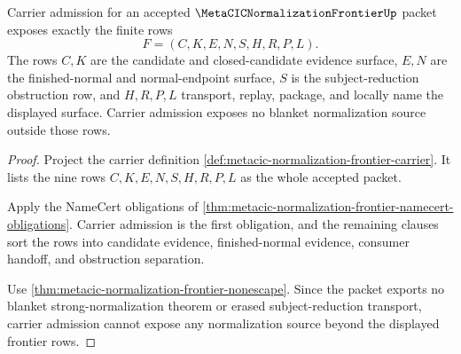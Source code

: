 \begin{theorem}
\label{thm:metacic-normalization-frontier-carrier-admission-route}
Carrier admission for an accepted $\MetaCICNormalizationFrontierUp$ packet exposes exactly the finite rows
$$
F=(C,K,E,N,S,H,R,P,L).
$$
The rows $C,K$ are the candidate and closed-candidate evidence surface, $E,N$ are the finished-normal and normal-endpoint surface, $S$ is the subject-reduction obstruction row, and $H,R,P,L$ transport, replay, package, and locally name the displayed surface. Carrier admission exposes no blanket normalization source outside those rows.
\end{theorem}
\begin{proof}
Project the carrier definition \autoref{def:metacic-normalization-frontier-carrier}. It lists the nine rows $C,K,E,N,S,H,R,P,L$ as the whole accepted packet.

Apply the NameCert obligations of \autoref{thm:metacic-normalization-frontier-namecert-obligations}. Carrier admission is the first obligation, and the remaining clauses sort the rows into candidate evidence, finished-normal evidence, consumer handoff, and obstruction separation.

Use \autoref{thm:metacic-normalization-frontier-nonescape}. Since the packet exports no blanket strong-normalization theorem or erased subject-reduction transport, carrier admission cannot expose any normalization source beyond the displayed frontier rows.
\end{proof}

